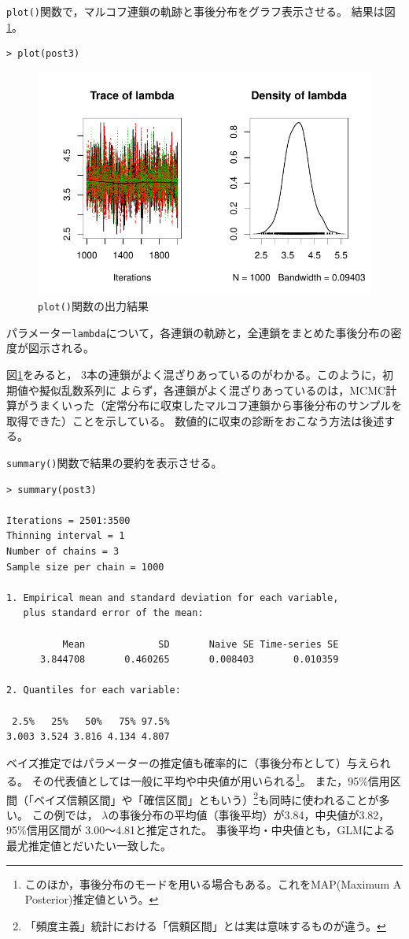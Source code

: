 \documentclass[11pt,uplatex]{jsarticle}
\begin{document}
\texttt{plot()}関数で，マルコフ連鎖の軌跡と事後分布をグラフ表示させる。
結果は図\ref{fig:plot}。
\begin{lstlisting}
> plot(post3)
\end{lstlisting}

\begin{figure}[hbtp]
  \begin{center}
    \includegraphics[bb=0 0 360 240, clip, width=260 bp]{example1-3.pdf}
  \end{center}
  \caption{\texttt{plot()}関数の出力結果}
  \label{fig:plot}
\end{figure}\noindent
パラメーター\texttt{lambda}について，各連鎖の軌跡と，全連鎖をまとめた事後分布の密度が図示される。

図\ref{fig:plot}をみると，
3本の連鎖がよく混ざりあっているのがわかる。このように，初期値や擬似乱数系列に
よらず，各連鎖がよく混ざりあっているのは，MCMC計算がうまくいった（定常分布に収束したマルコフ連鎖から事後分布のサンプルを取得できた）ことを示している。
数値的に収束の診断をおこなう方法は後述する。


\texttt{summary()}関数で結果の要約を表示させる。
\begin{lstlisting}
> summary(post3)

Iterations = 2501:3500
Thinning interval = 1 
Number of chains = 3 
Sample size per chain = 1000 

1. Empirical mean and standard deviation for each variable,
   plus standard error of the mean:

          Mean             SD       Naive SE Time-series SE 
      3.844708       0.460265       0.008403       0.010359 

2. Quantiles for each variable:

 2.5%   25%   50%   75% 97.5% 
3.003 3.524 3.816 4.134 4.807 

\end{lstlisting}
%
ベイズ推定ではパラメーターの推定値も確率的に（事後分布として）与えられる。
その代表値としては一般に平均や中央値が用いられる\footnote{このほか，事後分布のモードを用いる場合もある。これをMAP(Maximum A Posterior)推定値という。}。
また，95\%信用区間（「ベイズ信頼区間」や「確信区間」ともいう）\footnote{「頻度主義」統計における「信頼区間」とは実は意味するものが違う。}も同時に使われることが多い。
この例では，
$\lambda$の事後分布の平均値（事後平均）が3.84，中央値が3.82，95\%信用区間が
3.00〜4.81と推定された。
事後平均・中央値とも，GLMによる最尤推定値とだいたい一致した。
\end{document}
